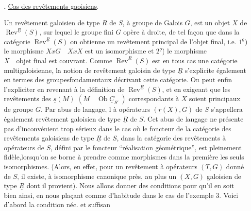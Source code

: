 . \uline{Cas des revêtements gaoisiens}.

Un revêtement \uline{galoisien} de type $\underline{R}$ de $S$, à groupe de Galois $G$, est un objet $X$ de $\operatorname{Rev}^{\underline{R}}(S)$, sur lequel le groupe fini $G$ opère à droite, de tel façon que dans la catégorie $\operatorname{Rev}^{\underline{R}}(S)$ on obtienne un revêtement principal de l'objet final, i.e. $1^{\underline{o}}$) le morphisme $XxG\quad XxX$ est un isomorphisme et $2^{\underline{o}}$) le morphisme $X\quad\text{objet final}$ est couvrant. Comme $\operatorname{Rev}^{\underline{R}}(S)$ est en tous cas une catégorie multigaloisienne, la notion de revêtement galoisin de type $\underline{R}$ s'explicite également en termes des groupesfondamentaux décrivant cette catégorie. On peut enfin l'expliciter en revenant à la définition de $\operatorname{Rev}^{\underline{R}}(S)$, et en exigeant que les revêtements des $\underline{s}(M)$ $(M\quad\operatorname{Ob}\underline{C}_{S'}\ )$ correspondants à $X$ soient principaux de groupe $G$. Par abus de langage, l à opérateurs $(\underline{r}(X),G)$ de $S$ s'appellera également revêtement galoisien de type $\underline{R}$ de $S$. Cet abus de langage ne présente pas d'inconvénient trop sérieux dans le cas où le foncteur de la catégorie des revêtements galoisiens de type $\underline{R}$ de $S$, dans la catégorie des revêtements à opérateurs de $S$, défini par le foncteur ``réalisation géométrique'', est pleinement fidèle,lorsqu'on se borne à prendre comme morphismes dans la première les seuls isomorphismes. (Alors, en effet, pour un revêtement à opérateurs $(T,G)$ donné de $S$, il existe, à isomorphisme canonique près, au plus un $(X,G)$  galoisien de type $\underline{R}$ dont il provient). Nous allons donner des conditions pour qu'il en soit bien ainsi, en nous plaçant comme d'habitude dans le cas de l'exemple 3. Voici d'abord la condition néc. et suffisan


